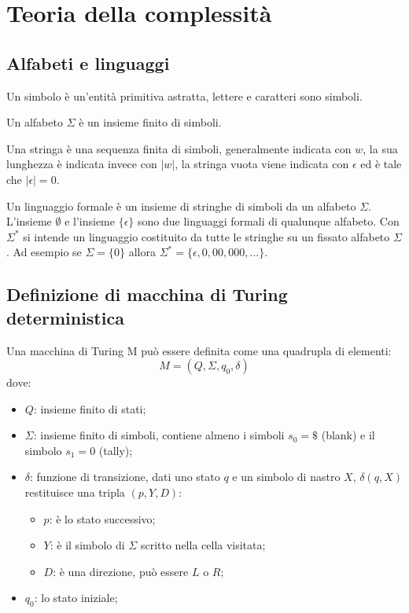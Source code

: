 

\chapter{Teoria della complessità ~\cite{3}~\cite{4}}
\label{complessita}
\section{Alfabeti e linguaggi}
\begin{definition}
    Un simbolo è un'entità primitiva astratta, lettere e caratteri sono simboli.
\end{definition}
\begin{definition}
    Un alfabeto $\Sigma$ è un insieme finito di simboli.
\end{definition}
\begin{definition}
    Una stringa è una sequenza finita di simboli, generalmente indicata con $w$, la sua lunghezza è indicata invece con $|w|$, la stringa vuota viene indicata con $\epsilon$ ed è tale che $|\epsilon|=0$.
\end{definition}
\begin{definition}
    Un linguaggio formale è un insieme di stringhe di simboli da un alfabeto $\Sigma$. \hfill \break
    L'insieme $\emptyset$ e l'insieme $\{\epsilon\}$ sono due linguaggi formali di qualunque alfabeto. \hfill \break
    Con $\Sigma^*$ si intende un linguaggio costituito da tutte le stringhe su un fissato alfabeto $\Sigma$. 
    Ad esempio se $\Sigma=\{0\}$ allora $\Sigma^*=\{\epsilon, 0,00,000,...\}$.
\end{definition}

\section{Definizione di macchina di Turing deterministica}
Una macchina di Turing M può essere definita come una quadrupla di elementi:
$$
M = (Q, \Sigma,q_0,\delta)
$$
dove:
\begin{itemize}
    \item $Q$: insieme finito di stati;
    \item $\Sigma$: insieme finito di simboli, contiene almeno i simboli $s_0=\$$ (blank) e il simbolo $s_1 = 0$ (tally);
    \item $\delta$: funzione di transizione, dati uno stato $q$ e un simbolo di nastro $X$, $\delta(q,X)$ restituisce una tripla $(p,Y,D)$:
    \begin{itemize}
        \item $p$: è lo stato successivo; 
        \item $Y$: è il simbolo di $\Sigma$ scritto nella cella visitata; 
        \item $D$: è una direzione, può essere $L$ o $R$; 
    \end{itemize}
    \item $q_0$: lo stato iniziale;
\end{itemize}

